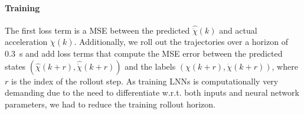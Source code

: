 \paragraph{Training}
The first loss term is a \gls{MSE} between the predicted $\hat{\ddot{\chi}}(k)$ and actual acceleration $\ddot{\chi}(k)$. Additionally, we roll out the trajectories over a horizon of \SI{0.3}{s} and add loss terms that compute the \gls{MSE} error between the predicted states $(\hat{\chi}(k+r), \hat{\dot{\chi}}(k+r))$ and the labels $(\chi(k+r), \dot{\chi}(k+r))$, where $r$ is the index of the rollout step.
As training \glspl{LNN} is computationally very demanding due to the need to differentiate w.r.t. both inputs and neural network parameters, we had to reduce the training rollout horizon. %

